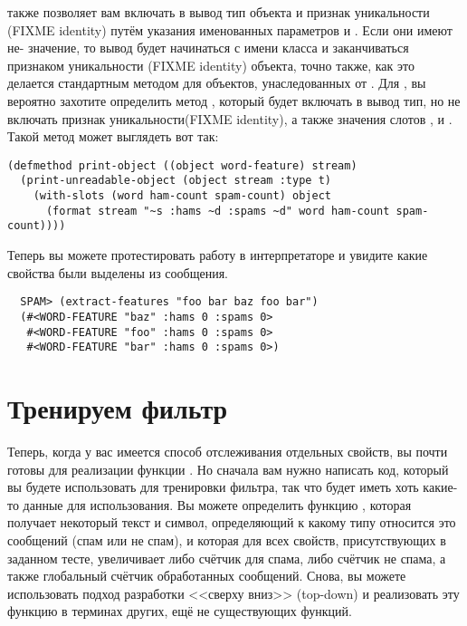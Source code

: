  также позволяет вам включать в вывод тип объекта и признак
уникальности (FIXME identity) путём указания именованных параметров  и
.  Если они имеют не- значение, то вывод будет начинаться с имени
класса и заканчиваться признаком уникальности (FIXME identity) объекта, точно также, как
это делается стандартным методом  для объектов, унаследованных от
.  Для , вы вероятно захотите определить метод
, который будет включать в вывод тип, но не включать признак
уникальности(FIXME identity), а также значения слотов ,  и
.  Такой метод может выглядеть вот так:

\begin{lstlisting}
(defmethod print-object ((object word-feature) stream)
  (print-unreadable-object (object stream :type t)
    (with-slots (word ham-count spam-count) object
      (format stream "~s :hams ~d :spams ~d" word ham-count spam-count))))
\end{lstlisting}

Теперь вы можете протестировать работу  в интерпретаторе и увидите
какие свойства были выделены из сообщения.

\begin{verbatim}
  SPAM> (extract-features "foo bar baz foo bar")
  (#<WORD-FEATURE "baz" :hams 0 :spams 0>
   #<WORD-FEATURE "foo" :hams 0 :spams 0>
   #<WORD-FEATURE "bar" :hams 0 :spams 0>)
\end{verbatim}

\section{Тренируем фильтр}

Теперь, когда у вас имеется способ отслеживания отдельных свойств, вы почти готовы для
реализации функции .  Но сначала вам нужно написать код, который вы будете
использовать для тренировки фильтра, так что  будет иметь хоть какие-то данные
для использования.  Вы можете определить функцию , которая получает некоторый
текст и символ, определяющий к какому типу относится это сообщений (спам или не спам), и
которая для всех свойств, присутствующих в заданном тесте, увеличивает либо счётчик для
спама, либо счётчик не спама, а также глобальный счётчик обработанных сообщений.  Снова,
вы можете использовать подход разработки <<сверху вниз>> (top-down) и реализовать эту
функцию в терминах других, ещё не существующих функций.

